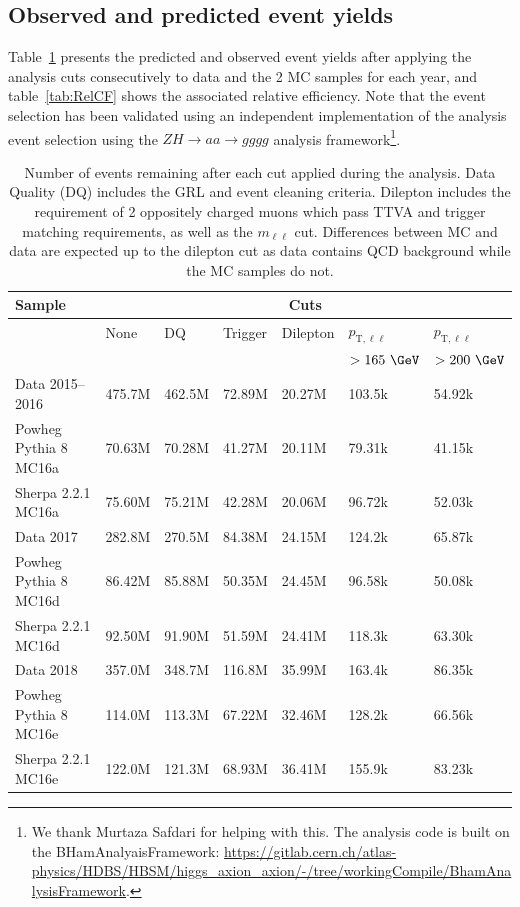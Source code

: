 
\subsection{Observed and predicted event yields}
\label{sec:cutflow}

Table~\ref{tab:CFComp} presents the predicted and observed event yields after applying the analysis cuts consecutively to data and the 2 MC samples for each year, and table~\ref{tab:RelCF} shows the associated relative efficiency.  Note that the event selection has been validated using an independent implementation of the analysis event selection using the $ZH\rightarrow aa\rightarrow gggg$ analysis framework\footnote{We thank Murtaza Safdari for helping with this.  The analysis code is built on the BHamAnalyaisFramework: \url{https://gitlab.cern.ch/atlas-physics/HDBS/HBSM/higgs_axion_axion/-/tree/workingCompile/BhamAnalysisFramework}.}.

\begin{table}[h!]
    \centering
    \begin{tabular}{l|l|l|l|l|l|l}
    \hline\hline
    \textbf{Sample} & \multicolumn{6}{c}{\textbf{Cuts}} \\ \hline
     & None & DQ & Trigger & Dilepton & $p_{\text{T},\ell\ell}$ & $p_{\text{T},\ell\ell}$ \\
     &  &  &  &  & $>165~\GeV$ & $>200~\GeV$ \\ \hline\hline
    Data 2015--2016 & 475.7M & 462.5M & 72.89M & 20.27M & 103.5k & 54.92k \\ \hline
    Powheg Pythia 8 MC16a & 70.63M & 70.28M & 41.27M & 20.11M & 79.31k & 41.15k \\ \hline
    Sherpa 2.2.1 MC16a & 75.60M & 75.21M & 42.28M & 20.06M & 96.72k & 52.03k \\ \hline\hline
    Data 2017 & 282.8M & 270.5M & 84.38M & 24.15M & 124.2k & 65.87k \\ \hline
    Powheg Pythia 8 MC16d & 86.42M & 85.88M & 50.35M & 24.45M & 96.58k & 50.08k \\ \hline
    Sherpa 2.2.1 MC16d & 92.50M & 91.90M & 51.59M & 24.41M & 118.3k & 63.30k \\ \hline\hline
    Data 2018 & 357.0M & 348.7M & 116.8M & 35.99M & 163.4k & 86.35k \\ \hline
    Powheg Pythia 8 MC16e & 114.0M & 113.3M & 67.22M & 32.46M & 128.2k & 66.56k \\ \hline
    Sherpa 2.2.1 MC16e & 122.0M & 121.3M & 68.93M & 36.41M & 155.9k & 83.23k \\ \hline\hline
    \end{tabular}
    \caption{Number of events remaining after each cut applied during the analysis. Data Quality (DQ) includes the GRL and event cleaning criteria.
    Dilepton includes the requirement of 2 oppositely charged muons which pass TTVA and trigger matching requirements, as well as the $m_{\ell\ell}$ cut.
    Differences between MC and data are expected up to the dilepton cut as data contains QCD background while the MC samples do not.}
    \label{tab:CFComp}
\end{table}

